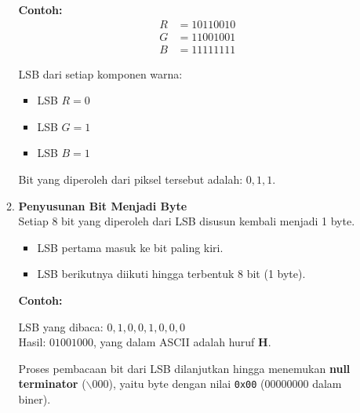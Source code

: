 \documentclass{ittelkom}
\begin{document}
\begin{enumerate}
\begin{enumerate}
                    \noindent
                    \textbf{Contoh:}
                    \[
                        \begin{array}{rl}
                            R & = 10110010 \\
                            G & = 11001001 \\
                            B & = 11111111
                        \end{array}
                    \]

                    \noindent
                    LSB dari setiap komponen warna:
                    \begin{itemize}
                        \item LSB $R = 0$
                        \item LSB $G = 1$
                        \item LSB $B = 1$
                    \end{itemize}

                    \noindent
                    Bit yang diperoleh dari piksel tersebut adalah: $0, 1, 1$.

              \item \textbf{Penyusunan Bit Menjadi Byte} \\
                    Setiap 8 bit yang diperoleh dari LSB disusun kembali menjadi 1 byte.
                    \begin{itemize}
                        \item LSB pertama masuk ke bit paling kiri.
                        \item LSB berikutnya diikuti hingga terbentuk 8 bit (1 byte).
                    \end{itemize}

                    \noindent
                    \textbf{Contoh:}
                    \begin{center}
                        LSB yang dibaca: $0, 1, 0, 0, 1, 0, 0, 0$ \\
                        Hasil: $01001000$, yang dalam ASCII adalah huruf \textbf{H}.
                    \end{center}

                    Proses pembacaan bit dari LSB dilanjutkan hingga menemukan \textbf{null
                        terminator} ($\backslash 000$), yaitu byte dengan nilai \texttt{0x00}
                    ($00000000$ dalam biner).


\end{enumerate}
\end{enumerate}
\end{document}
